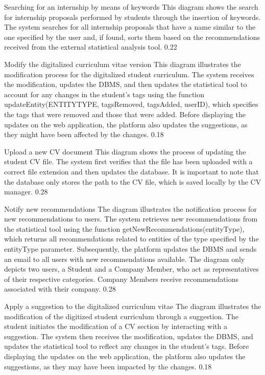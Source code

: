 \runtimeview
{Searching for an internship by means of keywords}
{
    This diagram shows the search for internship proposals performed by students through the insertion of keywords. The system searches for all internship proposals that have a name similar to the one specified by the user and, if found, sorts them based on the recommendations received from the external statistical analysis tool.
}
{0.22}

\runtimeview
{Modify the digitalized curriculum vitae version}
{
    This diagram illustrates the modification process for the digitalized student curriculum.
    The system receives the modification, updates the DBMS, and then updates the statistical tool to account for any changes in the student's tags using the function updateEntity(ENTITYTYPE, tagsRemoved, tagsAdded, userID), which specifies the tags that were removed and those that were added.
    Before displaying the updates on the web application, the platform also updates the suggestions, as they might have been affected by the changes.
}
{0.18}

\runtimeview
{Upload a new CV document}
{
    This diagram shows the process of updating the student CV file.
    The system first verifies that the file has been uploaded with a correct file extension and then updates the database.
    It is important to note that the database only stores the path to the CV file, which is saved locally by the CV manager.
}
{0.28}

\runtimeview
{Notify new recommendations}
{
    The diagram illustrates the notification process for new recommendations to users.
    The system retrieves new recommendations from the statistical tool using the function getNewRecommendations(entityType), which returns all recommendations related to entities of the type specified by the entityType parameter.
    Subsequently, the platform updates the DBMS and sends an email to all users with new recommendations available.
    The diagram only depicts two users, a Student and a Company Member, who act as representatives of their respective categories. Company Members receive recommendations associated with their company.
}
{0.28}

\runtimeview
{Apply a suggestion to the digitalized curriculum vitae}
{
    The diagram illustrates the modification of the digitized student curriculum through a suggestion.
    The student initiates the modification of a CV section by interacting with a suggestion. The system then receives the modification, updates the DBMS, and updates the statistical tool to reflect any changes in the student's tags.
    Before displaying the updates on the web application, the platform also updates the suggestions, as they may have been impacted by the changes.
}
{0.18}

